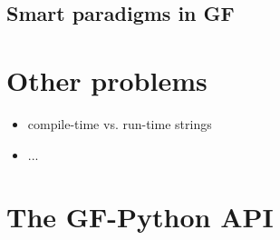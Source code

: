 \documentclass{scrartcl}
\begin{document}
\subsection{Smart paradigms in GF}


\section{Other problems}
\begin{itemize}
\item compile-time vs. run-time strings
\item ...
\end{itemize}
\section{The GF-Python API}
\end{document}

